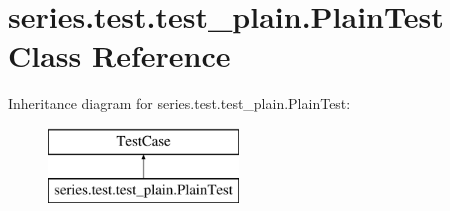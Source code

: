 \hypertarget{classseries_1_1test_1_1test__plain_1_1_plain_test}{}\section{series.\+test.\+test\+\_\+plain.\+Plain\+Test Class Reference}
\label{classseries_1_1test_1_1test__plain_1_1_plain_test}
Inheritance diagram for series.\+test.\+test\+\_\+plain.\+Plain\+Test\+:\begin{figure}[H]
\begin{center}
\leavevmode
\includegraphics[height=2.000000cm]{classseries_1_1test_1_1test__plain_1_1_plain_test}
\end{center}
\end{figure}
